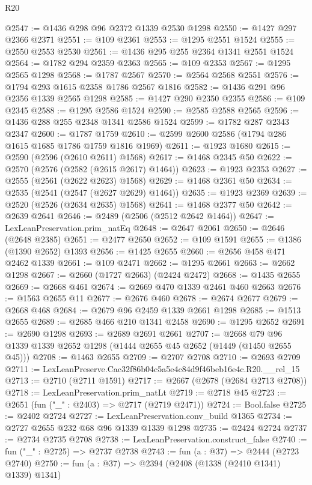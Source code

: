 \begin{lexlean}{R20}
\begin{coremodule}
@2547 := @1436 @298 @96 @2372 @1339 @2530 @1298
@2550 := @1427 @297 @2366 @2371
@2551 := @109 @2361
@2553 := @1295 @2551 @1524
@2555 := @2550 @2553 @2530
@2561 := @1436 @295 @255 @2364 @1341 @2551 @1524
@2564 := @1782 @294 @2359 @2363
@2565 := @109 @2353
@2567 := @1295 @2565 @1298
@2568 := @1787 @2567
@2570 := @2564 @2568 @2551
@2576 := @1794 @293 @1615 @2358 @1786 @2567 @1816
@2582 := @1436 @291 @96 @2356 @1339 @2565 @1298
@2585 := @1427 @290 @2350 @2355
@2586 := @109 @2345
@2588 := @1295 @2586 @1524
@2590 := @2585 @2588 @2565
@2596 := @1436 @288 @255 @2348 @1341 @2586 @1524
@2599 := @1782 @287 @2343 @2347
@2600 := @1787 @1759
@2610 := @2599 @2600 @2586 (@1794 @286 @1615 @1685 @1786 @1759 @1816 @1969)
@2611 := @1923 @1680
@2615 := @2590 (@2596 (@2610 @2611) @1568)
@2617 := @1468 @2345 @50
@2622 := @2570 (@2576 (@2582 (@2615 @2617) @1464))
@2623 := @1923 @2353
@2627 := @2555 (@2561 (@2622 @2623) @1568)
@2629 := @1468 @2361 @50
@2634 := @2535 (@2541 (@2547 (@2627 @2629) @1464))
@2635 := @1923 @2369
@2639 := @2520 (@2526 (@2634 @2635) @1568)
@2641 := @1468 @2377 @50
@2642 := @2639 @2641
@2646 := @2489 (@2506 (@2512 @2642 @1464))
@2647 := LexLeanPreservation.prim_natEq
@2648 := @2647 @2061
@2650 := @2646 (@2648 @2385)
@2651 := @2477 @2650
@2652 := @109 @1591
@2655 := @1386 (@1390 @2652) @1393
@2656 := @1425 @2655
@2660 := @2656 @458 @471 @2462 @1339
@2661 := @109 @2471
@2662 := @1295 @2661
@2663 := @2662 @1298
@2667 := @2660 (@1727 @2663) (@2424 @2472)
@2668 := @1435 @2655
@2669 := @2668 @461
@2674 := @2669 @470 @1339 @2461 @460 @2663
@2676 := @1563 @2655 @11
@2677 := @2676 @460
@2678 := @2674 @2677
@2679 := @2668 @468
@2684 := @2679 @96 @2459 @1339 @2661 @1298
@2685 := @1513 @2655
@2689 := @2685 @466 @210 @1341 @2458
@2690 := @1295 @2652
@2691 := @2690 @1298
@2693 := @2689 @2691 @2661
@2707 := @2668 @79 @96 @1339 @1339 @2652 @1298 (@1444 @2655 @45 @2652 (@1449 (@1450 @2655 @45)))
@2708 := @1463 @2655
@2709 := @2707 @2708
@2710 := @2693 @2709
@2711 := LexLeanPreserve.Cac32f86b04c5a5e4c84d9f46beb16e4c.R20.__rel_15
@2713 := @2710 (@2711 @1591)
@2717 := @2667 (@2678 (@2684 @2713 @2708))
@2718 := LexLeanPreservation.prim_natLt
@2719 := @2718 @45
@2723 := @2651 (fun ("_" : @2403) => @2717 (@2719 @2471))
@2724 := Bool.false
@2725 := @2402 @2724
@2727 := LexLeanPreservation.conv_build @1365
@2734 := @2727 @2655 @232 @68 @96 @1339 @1339 @1298
@2735 := @2424 @2724
@2737 := @2734 @2735 @2708
@2738 := LexLeanPreservation.construct_false
@2740 := fun ("_" : @2725) => @2737 @2738
@2743 := fun (a : @37) => @2444 (@2723 @2740)
@2750 := fun (a : @37) => @2394 (@2408 (@1338 (@2410 @1341) @1339) @1341)

\end{coremodule}
\end{lexlean}
